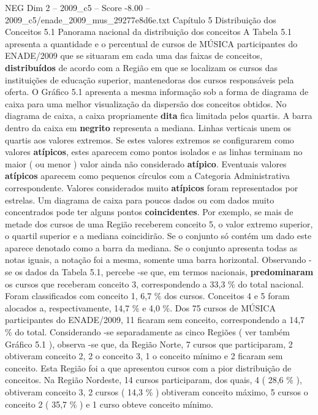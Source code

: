\begin{textsample}{NEG Dim 2 – 2009\_c5 – Score -8.00 – 2009\_c5/enade\_2009\_mus\_29277e8d6e.txt}  \label{ex:f2_neg_013}
Capítulo 5 Distribuição dos Conceitos 5.1 Panorama nacional da distribuição dos conceitos A Tabela 5.1 apresenta a quantidade e o percentual de cursos de MÚSICA participantes do ENADE/2009 que se situaram em cada uma das faixas de conceitos, \textbf{distribuídos} de acordo com a Região em que se localizam os cursos das instituições de educação superior, mantenedoras dos cursos responsáveis pela oferta.
O Gráfico 5.1 apresenta a mesma informação sob a forma de diagrama de caixa para uma melhor visualização da dispersão dos conceitos obtidos.
No diagrama de caixa, a caixa propriamente \textbf{dita} fica limitada pelos quartis.
A barra dentro da caixa em \textbf{negrito} representa a mediana.
Linhas verticais unem os quartis aos valores extremos.
Se estes valores extremos se configurarem como valores \textbf{atípicos}, estes aparecem como pontos isolados e as linhas terminam no maior ( ou menor ) valor ainda não considerado \textbf{atípico}.
Eventuais valores \textbf{atípicos} aparecem como pequenos círculos com a Categoria Administrativa correspondente.
Valores considerados muito \textbf{atípicos} foram representados por estrelas.
Um diagrama de caixa para poucos dados ou com dados muito concentrados pode ter alguns pontos \textbf{coincidentes}.
Por exemplo, se mais de metade dos cursos de uma Região receberem conceito 5, o valor extremo superior, o quartil superior e a mediana coincidirão.
Se o conjunto só contém um dado este aparece denotado como a barra da mediana.
Se o conjunto apresenta todas as notas iguais, a notação foi a mesma, somente uma barra horizontal.
Observando -se os dados da Tabela 5.1, percebe -se que, em termos nacionais, \textbf{predominaram} os cursos que receberam conceito 3, correspondendo a 33,3 \% do total nacional.
Foram classificados com conceito 1, 6,7 \% dos cursos.
Conceitos 4 e 5 foram alocados a, respectivamente, 14,7 \% e 4,0 \%.
Dos 75 cursos de MÚSICA participantes do ENADE/2009, 11 ficaram sem conceito, correspondendo a 14,7 \% do total.
Considerando -se separadamente as cinco Regiões ( ver também Gráfico 5.1 ), observa -se que, da Região Norte, 7 cursos que participaram, 2 obtiveram conceito 2, 2 o conceito 3, 1 o conceito mínimo e 2 ficaram sem conceito.
Esta Região foi a que apresentou cursos com a pior distribuição de conceitos.
Na Região Nordeste, 14 cursos participaram, dos quais, 4 ( 28,6 \% ), obtiveram conceito 3, 2 cursos ( 14,3 \% ) obtiveram conceito máximo, 5 cursos o conceito 2 ( 35,7 \% ) e 1 curso obteve conceito mínimo.

\end{textsample}
